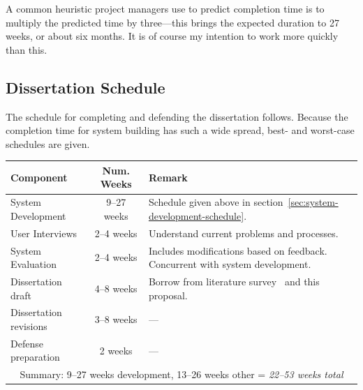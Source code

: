 \documentclass[12pt]{article}
\begin{document}
A common heuristic project managers use to predict completion time is
to multiply the predicted time by three---this brings the expected
duration to 27 weeks, or about six months. It is of course my
intention to work more quickly than this.

\subsection{Dissertation Schedule}

The schedule for completing and defending the dissertation
follows. Because the completion time for system building has such a
wide spread, best- and worst-case schedules are given.

\vspace{12pt}
\begin{tabular}{ | l | c | p{80mm} | }
  \hline

  \textbf{Component} & \textbf{Num. Weeks} & \textbf{Remark} \\

  \hline \hline

  System Development & 9--27 weeks & Schedule given above in
  section~\ref{sec:system-development-schedule}. \\

  User Interviews & 2--4 weeks & Understand current problems and
  processes. \\

  System Evaluation & 2--4 weeks & Includes modifications based on
  feedback. Concurrent with system development. \\ 

  Dissertation draft & 4--8 weeks & Borrow from literature
  survey~\cite{johnson-sketch-review} and this proposal. \\

  Dissertation revisions & 3--8 weeks & ---\\

  Defense preparation & 2 weeks & ---\\

  \hline

  \multicolumn{3}{|c|}{
    Summary: 9--27 weeks development, 13--26 weeks other = 
    \textit{22--53 weeks total}
  } \\

  \hline

\end{tabular}

\singlespacing\newpage



\end{document}
